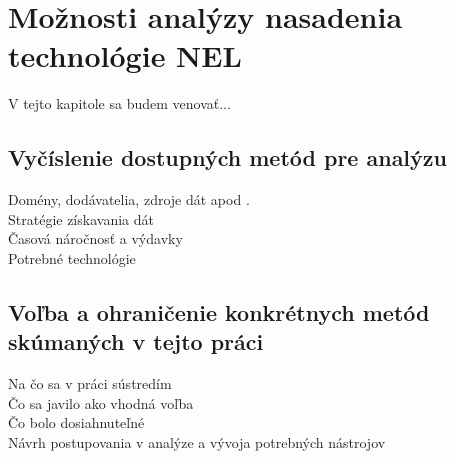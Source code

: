 \chapter{Možnosti analýzy nasadenia technológie NEL}
\label{possible-analysis-strategies}

V tejto kapitole sa budem venovať...


\section{Vyčíslenie dostupných metód pre analýzu}

Domény, dodávatelia, zdroje dát apod \cite{automatic-js-restrictor-testing}.
\\
Stratégie získavania dát
\\
Časová náročnosť a výdavky
\\
Potrebné technológie

\section{Voľba a ohraničenie konkrétnych metód skúmaných v tejto práci}

Na čo sa v práci sústredím
\\
Čo sa javilo ako vhodná voľba
\\
Čo bolo dosiahnuteľné
\\
Návrh postupovania v analýze a vývoja potrebných nástrojov